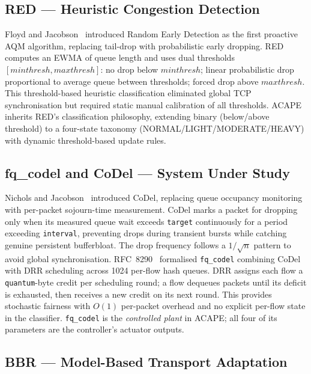 \documentclass[conference]{IEEEtran}
\begin{document}
\subsection{RED --- Heuristic Congestion Detection}

Floyd and Jacobson~\cite{red1993} introduced Random Early Detection as the
first proactive AQM algorithm, replacing tail-drop with probabilistic early
dropping. RED computes an EWMA of queue length and uses dual thresholds
$[\mathit{minthresh}, \mathit{maxthresh}]$: no drop below $\mathit{minthresh}$;
linear probabilistic drop proportional to average queue between thresholds;
forced drop above $\mathit{maxthresh}$. This threshold-based heuristic
classification eliminated global TCP synchronisation but required static manual
calibration of all thresholds. ACAPE inherits RED's classification philosophy,
extending binary (below/above threshold) to a four-state taxonomy
(NORMAL/LIGHT/MODERATE/HEAVY) with dynamic threshold-based update rules.

\subsection{fq\_codel and CoDel --- System Under Study}

Nichols and Jacobson~\cite{nichols2012} introduced CoDel, replacing queue
occupancy monitoring with per-packet sojourn-time measurement. CoDel marks a
packet for dropping only when its measured queue wait exceeds \texttt{target}
continuously for a period exceeding \texttt{interval}, preventing drops during
transient bursts while catching genuine persistent bufferbloat. The drop
frequency follows a $1/\sqrt{n}$ pattern to avoid global synchronisation.
RFC~8290~\cite{rfc8290} formalised \texttt{fq\_codel} combining CoDel with DRR
scheduling across 1024 per-flow hash queues. DRR assigns each flow a
\texttt{quantum}-byte credit per scheduling round; a flow dequeues packets until
its deficit is exhausted, then receives a new credit on its next round. This
provides stochastic fairness with $O(1)$ per-packet overhead and no explicit
per-flow state in the classifier. \texttt{fq\_codel} is the \emph{controlled
plant} in ACAPE; all four of its parameters are the controller's actuator
outputs.

\subsection{BBR --- Model-Based Transport Adaptation}
\end{document}

